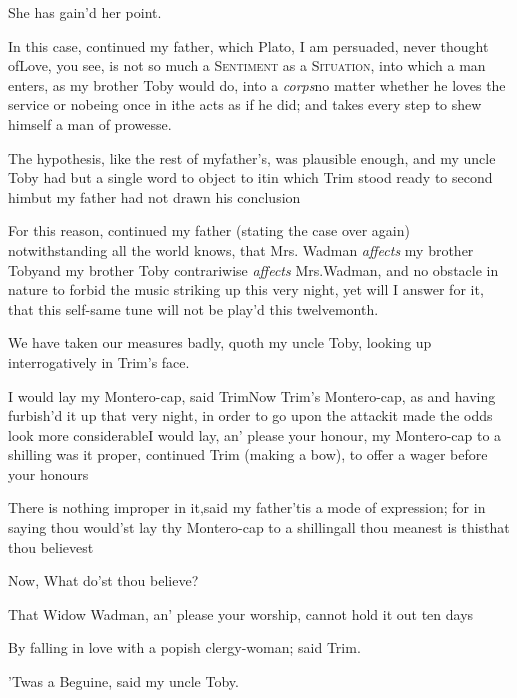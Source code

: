 \documentclass{article}
\begin{document}
\tsh She has gain’d her point.

In this case, continued my father, which Plato, I am
persuaded, never thought of\tsh Love, you see, is not so
much a \textsc{Sentiment} as a \textsc{Situation}, into
which a man enters, as my brother Toby would do, into a
\textit{corps}\tsh no matter whether he loves the service or
no\tsh being once in it\tsk he acts as if he did; and
takes every step to shew himself a man of prowesse.

The hypothesis, like the rest of my\break father’s, was
plausible enough, and my uncle Toby had but a single word to
object to it\tsk in which Trim stood ready to second
him\tsh but my father had not drawn his
conclusion\tsh

For this reason, continued my father (stating the case over
again) notwithstanding all the world knows, that Mrs.
Wadman \textit{affects} my brother Toby\tsk and my brother
Toby contrariwise \textit{affects} Mrs.\@ Wadman, and no
obstacle in nature to forbid the music striking up this very night,
yet will I answer for it, that this self-same tune will not be
play’d this twelvemonth.

We have taken our measures badly, quoth my uncle Toby,
looking up interrogatively in Trim’s face.

I would lay my Montero-cap, said
Trim\tsh Now Trim’s
Montero-cap, as\break
{}
and having furbish’d it up that very night, in
order to go upon the attack\tsk it made the odds look more
considerable\break\null\tsh I would lay, an’ please your
honour, my Montero-cap to a shilling\tsk {} was it proper,
continued Trim (making a bow), to offer a wager before your
honours\tsh

\tsk There is nothing improper in it,\break said my
father\tsk ’tis a mode of expression; for in saying thou
would’st lay thy Montero-cap to a shilling\tsk all
thou meanest is this\tsk that thou believest\tsh

\tsh Now, What do’st thou believe?

That Widow Wadman, an’ please your worship, cannot
hold it out ten days\tsh

\noindent
{}

By falling in love with a popish clergy-woman; said
Trim.

’Twas a Beguine, said my uncle Toby.
\end{document}
